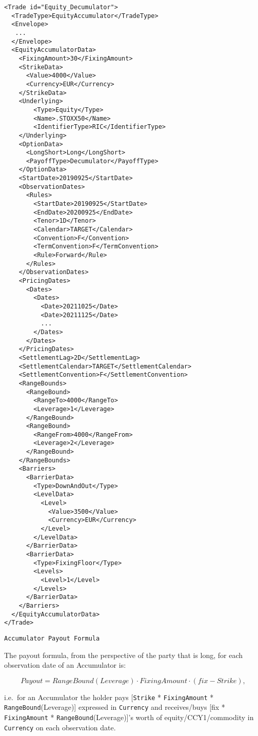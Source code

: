 \begin{verbatim}
<Trade id="Equity_Decumulator">
  <TradeType>EquityAccumulator</TradeType>
  <Envelope>
   ...
  </Envelope>
  <EquityAccumulatorData>
    <FixingAmount>30</FixingAmount>
    <StrikeData>
      <Value>4000</Value>
      <Currency>EUR</Currency>
    </StrikeData>
    <Underlying>
        <Type>Equity</Type>
        <Name>.STOXX50</Name>
        <IdentifierType>RIC</IdentifierType>
    </Underlying>
    <OptionData>
      <LongShort>Long</LongShort>
      <PayoffType>Decumulator</PayoffType>
    </OptionData>
    <StartDate>20190925</StartDate>
    <ObservationDates>
      <Rules>
        <StartDate>20190925</StartDate>
        <EndDate>20200925</EndDate>
        <Tenor>1D</Tenor>
        <Calendar>TARGET</Calendar>
        <Convention>F</Convention>
        <TermConvention>F</TermConvention>
        <Rule>Forward</Rule>
      </Rules>
    </ObservationDates>
    <PricingDates>
      <Dates>
        <Dates>
          <Date>20211025</Date>
          <Date>20211125</Date>
          ...
        </Dates>
      </Dates>
    </PricingDates>
    <SettlementLag>2D</SettlementLag>
    <SettlementCalendar>TARGET</SettlementCalendar>
    <SettlementConvention>F</SettlementConvention>
    <RangeBounds>
      <RangeBound>
        <RangeTo>4000</RangeTo>
        <Leverage>1</Leverage>
      </RangeBound>
      <RangeBound>
        <RangeFrom>4000</RangeFrom>
        <Leverage>2</Leverage>
      </RangeBound>
    </RangeBounds>
    <Barriers>
      <BarrierData>
        <Type>DownAndOut</Type>
        <LevelData>
          <Level>
            <Value>3500</Value>
            <Currency>EUR</Currency>
          </Level>
        </LevelData>
      </BarrierData>
      <BarrierData>
        <Type>FixingFloor</Type>
        <Levels>
          <Level>1</Level>
        </Levels>
      </BarrierData>
    </Barriers>
  </EquityAccumulatorData>
</Trade>
\end{verbatim}

\lstinline!Accumulator Payout Formula!

The payout formula, from the perspective of the party that is long, for each observation date of an Accumulator is:

$$
Payout = RangeBound(Leverage) \cdot FixingAmount \cdot (fix - Strike),
$$

i.e.\ for an Accumulator the holder pays 
 [\lstinline!Strike! * \lstinline!FixingAmount! * \lstinline!RangeBound!(Leverage)] expressed in \lstinline!Currency! and receives/buys 
 [fix * \lstinline!FixingAmount! * \lstinline!RangeBound!(Leverage)]'s worth of equity/CCY1/commodity in \lstinline!Currency! on each  observation date.

